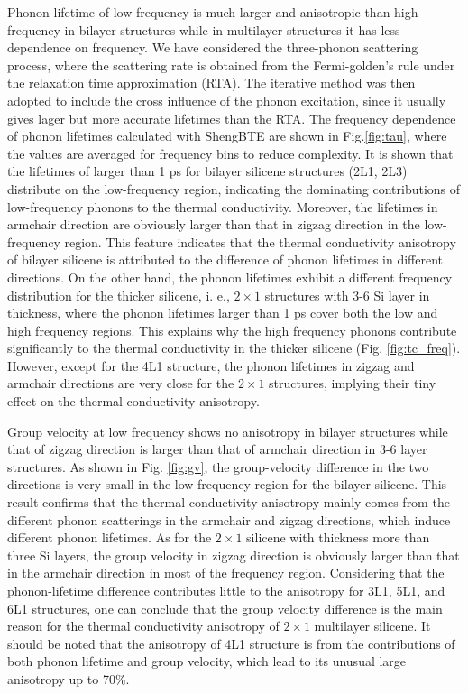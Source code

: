 \documentclass[review]{elsarticle}
\begin{document}
Phonon lifetime of low frequency is much larger and anisotropic than high frequency in bilayer structures while in multilayer structures it has less dependence on frequency. We have considered the three-phonon scattering process, where the scattering rate is obtained from the Fermi-golden's rule\cite{Li2014} under the relaxation time approximation (RTA). The iterative method was then adopted to include the cross influence of the phonon excitation, since it usually gives lager but more accurate lifetimes than the RTA. The frequency dependence of phonon lifetimes calculated with ShengBTE\cite{Li2014} are shown in Fig.\ref{fig:tau}, where the values are averaged for frequency bins to reduce complexity.  It is shown that the lifetimes of larger than 1 ps for bilayer silicene structures (2L1, 2L3) distribute on the low-frequency region, indicating the dominating contributions of low-frequency phonons to the thermal conductivity. Moreover, the lifetimes in armchair direction are obviously larger than that in zigzag direction in the low-frequency region. This feature indicates that the thermal conductivity anisotropy of bilayer silicene is attributed to the difference of phonon lifetimes in different directions.
On the other hand, the phonon lifetimes exhibit a different frequency distribution for the thicker silicene, i. e.,  $2\times1$ structures with 3-6 Si layer in thickness, where the phonon lifetimes larger than 1 ps cover both the low and high frequency regions.  This explains why the high frequency phonons contribute significantly to the thermal conductivity in the thicker silicene (Fig. \ref{fig:tc_freq}).  However, except for the 4L1 structure, the phonon lifetimes in zigzag and armchair directions are very close for the $2\times1$ structures, implying their tiny effect on the thermal conductivity anisotropy.



Group velocity at low frequency shows no anisotropy in bilayer structures while that of zigzag direction is larger than that of armchair direction in 3-6 layer structures. As shown in Fig. \ref{fig:gv},  the group-velocity difference in the two directions is very small in the low-frequency region for the bilayer silicene. This result confirms that the thermal conductivity anisotropy mainly comes from the different phonon scatterings in the armchair and zigzag directions,  which induce different phonon lifetimes.
As for the $2\times 1$ silicene with thickness more than three Si layers,  the group velocity in zigzag direction is obviously larger than that in the armchair direction in most of the frequency region. Considering that the phonon-lifetime difference contributes little to the anisotropy for 3L1, 5L1, and 6L1 structures, one can conclude that the group velocity difference is the main reason for the thermal conductivity anisotropy of $2\times 1$ multilayer silicene. It should be noted that the anisotropy of 4L1 structure is from the contributions of both phonon lifetime and group velocity, which lead to its unusual large anisotropy up to 70\%.
\end{document}
